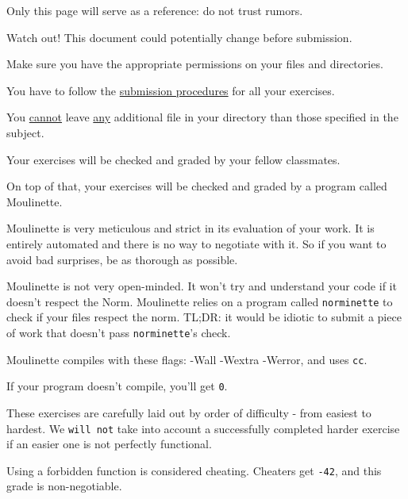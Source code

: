 

\item Only this page will serve as a reference: do not trust rumors.
\item Watch out! This document could potentially change before submission.
\item Make sure you have the appropriate permissions on your files and directories.
\item You have to follow the \underline{submission procedures} for all your
	exercises.
\item You \underline{cannot} leave \underline{any} additional file in your
	directory than those specified in the subject.
\item Your exercises will be checked and graded by your fellow classmates.
\item On top of that, your exercises will be checked and graded by a program
	called Moulinette.
\item Moulinette is very meticulous and strict in its evaluation of your
	work. It is entirely automated and there is no way to negotiate with it.
	So if you want to avoid bad surprises, be as thorough as possible.
\item Moulinette is not very open-minded. It won’t try and understand your code if it doesn’t respect the Norm.
	Moulinette relies on a program called \texttt{norminette} to check if your files respect the norm.
	TL;DR: it would be idiotic to submit a piece of work that doesn’t pass \texttt{norminette}’s check.
\item Moulinette compiles with these flags: -Wall -Wextra -Werror, and uses \texttt{cc}.
\item If your program doesn’t compile, you’ll get \texttt{0}.
\item These exercises are carefully laid out by order of difficulty -
	from easiest to hardest. We \texttt{will not} take into account a successfully
	completed harder exercise if an easier one is not perfectly functional.
\item Using a forbidden function is considered cheating. Cheaters get \texttt{-42}, and this grade is non-negotiable.

